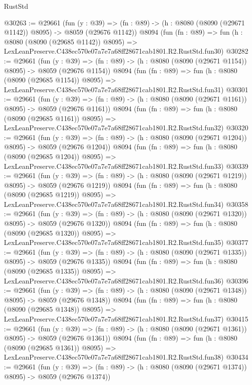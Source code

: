 \begin{lexlean}{RustStd}
\begin{coremodule}
@30263 := @29661
    (fun (y : @39) =>
    (fn : @89) -> (h : @8080 (@8090 (@29671 @1142)) @8095) -> @8059 (@29676 @1142))
    @8094
    (fun (fn : @89) =>
    fun (h : @8080 (@8090 (@29685 @1142)) @8095) =>
    LexLeanPreserve.C438ec570e07a7e7a68ff28671cab1801.R2.RustStd.fun30)
@30282 := @29661
    (fun (y : @39) =>
    (fn : @89) -> (h : @8080 (@8090 (@29671 @1154)) @8095) -> @8059 (@29676 @1154))
    @8094
    (fun (fn : @89) =>
    fun (h : @8080 (@8090 (@29685 @1154)) @8095) =>
    LexLeanPreserve.C438ec570e07a7e7a68ff28671cab1801.R2.RustStd.fun31)
@30301 := @29661
    (fun (y : @39) =>
    (fn : @89) -> (h : @8080 (@8090 (@29671 @1161)) @8095) -> @8059 (@29676 @1161))
    @8094
    (fun (fn : @89) =>
    fun (h : @8080 (@8090 (@29685 @1161)) @8095) =>
    LexLeanPreserve.C438ec570e07a7e7a68ff28671cab1801.R2.RustStd.fun32)
@30320 := @29661
    (fun (y : @39) =>
    (fn : @89) -> (h : @8080 (@8090 (@29671 @1204)) @8095) -> @8059 (@29676 @1204))
    @8094
    (fun (fn : @89) =>
    fun (h : @8080 (@8090 (@29685 @1204)) @8095) =>
    LexLeanPreserve.C438ec570e07a7e7a68ff28671cab1801.R2.RustStd.fun33)
@30339 := @29661
    (fun (y : @39) =>
    (fn : @89) -> (h : @8080 (@8090 (@29671 @1219)) @8095) -> @8059 (@29676 @1219))
    @8094
    (fun (fn : @89) =>
    fun (h : @8080 (@8090 (@29685 @1219)) @8095) =>
    LexLeanPreserve.C438ec570e07a7e7a68ff28671cab1801.R2.RustStd.fun34)
@30358 := @29661
    (fun (y : @39) =>
    (fn : @89) -> (h : @8080 (@8090 (@29671 @1320)) @8095) -> @8059 (@29676 @1320))
    @8094
    (fun (fn : @89) =>
    fun (h : @8080 (@8090 (@29685 @1320)) @8095) =>
    LexLeanPreserve.C438ec570e07a7e7a68ff28671cab1801.R2.RustStd.fun35)
@30377 := @29661
    (fun (y : @39) =>
    (fn : @89) -> (h : @8080 (@8090 (@29671 @1335)) @8095) -> @8059 (@29676 @1335))
    @8094
    (fun (fn : @89) =>
    fun (h : @8080 (@8090 (@29685 @1335)) @8095) =>
    LexLeanPreserve.C438ec570e07a7e7a68ff28671cab1801.R2.RustStd.fun36)
@30396 := @29661
    (fun (y : @39) =>
    (fn : @89) -> (h : @8080 (@8090 (@29671 @1348)) @8095) -> @8059 (@29676 @1348))
    @8094
    (fun (fn : @89) =>
    fun (h : @8080 (@8090 (@29685 @1348)) @8095) =>
    LexLeanPreserve.C438ec570e07a7e7a68ff28671cab1801.R2.RustStd.fun37)
@30415 := @29661
    (fun (y : @39) =>
    (fn : @89) -> (h : @8080 (@8090 (@29671 @1361)) @8095) -> @8059 (@29676 @1361))
    @8094
    (fun (fn : @89) =>
    fun (h : @8080 (@8090 (@29685 @1361)) @8095) =>
    LexLeanPreserve.C438ec570e07a7e7a68ff28671cab1801.R2.RustStd.fun38)
@30434 := @29661
    (fun (y : @39) =>
    (fn : @89) -> (h : @8080 (@8090 (@29671 @1374)) @8095) -> @8059 (@29676 @1374))

\end{coremodule}
\end{lexlean}
